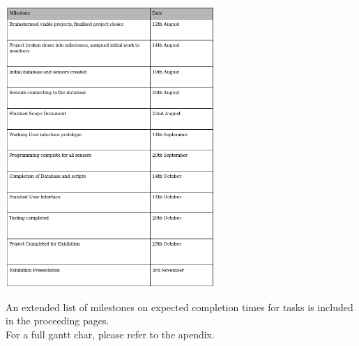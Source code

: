 \documentclass{article}
\begin{document}
        \begin{center}
            \includegraphics[width=300px]{Images/Milestones.jpg}
        \end{center}
        An extended list of milestones on expected completion times for tasks is included in the proceeding pages.
        \\
        For a full gantt char, please refer to the apendix.
\end{document}
